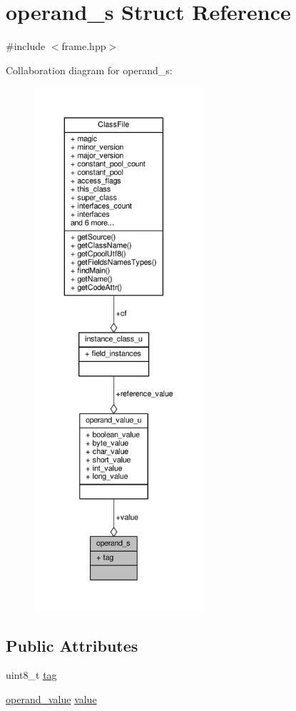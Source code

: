\hypertarget{structoperand__s}{\section{operand\+\_\+s Struct Reference}
\label{structoperand__s}
}


{\ttfamily \#include $<$frame.\+hpp$>$}



Collaboration diagram for operand\+\_\+s\+:\nopagebreak
\begin{figure}[H]
\begin{center}
\leavevmode
\includegraphics[height=550pt]{structoperand__s__coll__graph}
\end{center}
\end{figure}
\subsection*{Public Attributes}
\begin{DoxyCompactItemize}
\item 
uint8\+\_\+t \hyperlink{structoperand__s_a3096a61fdc761a5231b863b2945165bb}{tag}
\item 
\hyperlink{frame_8hpp_a1082aacc4b1471d93e3277f0d0209e72}{operand\+\_\+value} \hyperlink{structoperand__s_ae5e9c83467419221b9bc57dd8dff5ad6}{value}
\end{DoxyCompactItemize}


